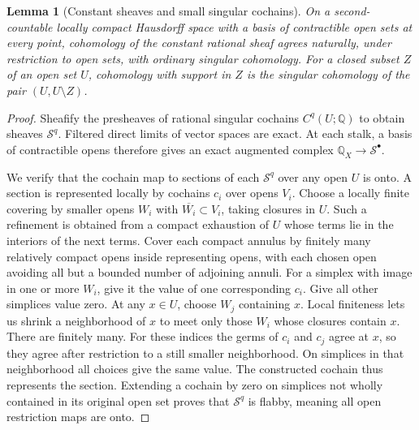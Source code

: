 \documentclass[11pt,oneside,openany]{book}
\newtheorem{lemma}[theorem]{Lemma}
\theoremstyle{definition}
\theoremstyle{remark}
\begin{document}
\begin{lemma}[Constant sheaves and small singular cochains]
\label{res:GS06}
On a second-countable locally compact Hausdorff space with
a basis of contractible open sets at every point,
cohomology of the constant rational sheaf agrees naturally,
under restriction to open sets, with ordinary singular
cohomology. For a closed subset \(Z\) of an open set \(U\),
cohomology with support in \(Z\) is the singular cohomology
of the pair \((U,U\setminus Z)\).
\end{lemma}

\begin{proof}
Sheafify the presheaves of rational singular cochains
\(C^q(U;\mathbb Q)\) to obtain sheaves \(\mathcal S^q\).
Filtered direct limits of vector spaces are exact.
At each stalk, a basis of contractible opens therefore
gives an exact augmented complex
\(\mathbb Q_X\longrightarrow\mathcal S^\bullet\).

We verify that the cochain map to sections of each
\(\mathcal S^q\) over any open \(U\) is onto.
A section is represented locally by cochains \(c_i\) over
opens \(V_i\). Choose a locally finite covering by smaller
opens \(W_i\) with \(\overline{W_i}\subset V_i\), taking closures
in \(U\). Such a refinement is obtained from a compact
exhaustion of \(U\) whose terms lie in the interiors of
the next terms. Cover each compact annulus by finitely many
relatively compact opens inside representing opens,
with each chosen open avoiding all but a bounded number
of adjoining annuli.
For a simplex with image in one or more \(W_i\), give it
the value of one corresponding \(c_i\). Give all other
simplices value zero. At any \(x\in U\), choose \(W_j\)
containing \(x\). Local finiteness lets us shrink a
neighborhood of \(x\) to meet only those \(W_i\) whose
closures contain \(x\). There are finitely many. For these
indices the germs of \(c_i\) and \(c_j\) agree at \(x\),
so they agree after restriction to a still smaller
neighborhood. On simplices in that neighborhood all
choices give the same value. The constructed cochain thus
represents the section. Extending a cochain by zero on
simplices not wholly contained in its original open set
proves that \(\mathcal S^q\) is flabby, meaning all open
restriction maps are onto.


\end{proof}
\end{document}
